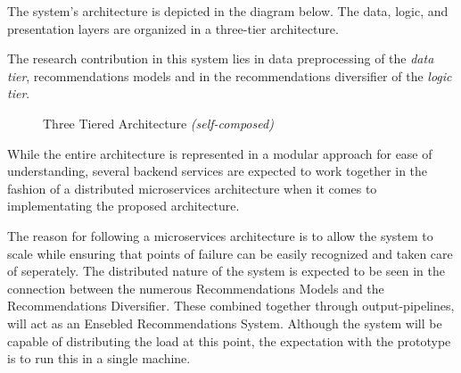 The system's architecture is depicted in the diagram below. The data, logic, and presentation layers are organized in a three-tier architecture.

The research contribution in this system lies in data preprocessing of the \textit{data tier}, recommendations models and in the recommendations diversifier of the \textit{logic tier}.


\begin{figure}[h!]
\centering
{}
\caption{Three Tiered Architecture \textit{(self-composed)}}
\label{fig:three-tiered-architecuture}
\end{figure}

While the entire architecture is represented in a modular approach for ease of understanding, several backend services are expected to work together in the fashion of a distributed microservices architecture when it comes to implementating the proposed architecture.

The reason for following a microservices architecture is to allow the system to scale while ensuring that points of failure can be easily recognized and taken care of seperately. The distributed nature of the system is expected to be seen in the connection between the numerous Recommendations Models and the Recommendations Diversifier. These combined together through output-pipelines, will act as an Ensebled Recommendations System. Although the system will be capable of distributing the load at this point, the expectation with the prototype is to run this in a single machine.


